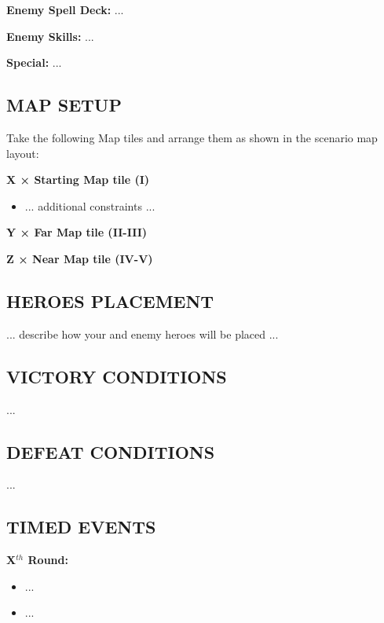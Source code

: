 \begin{multicols*}{2}
\textbf{Enemy Spell Deck:} ...

\textbf{Enemy Skills:} ...

\textbf{Special:} ...

\subsection*{\MakeUppercase{Map setup}}

Take the following Map tiles and arrange them as shown in the scenario map layout:

\textbf{X × Starting Map tile (I)}
\begin{itemize}
    \item ... additional constraints ...
\end{itemize}

\textbf{Y × Far Map tile (II-III)}

\textbf{Z × Near Map tile (IV-V)}

\subsection*{\MakeUppercase{Heroes placement}}

... describe how your and enemy heroes will be placed ...

\subsection*{\MakeUppercase{Victory Conditions}}
...

\subsection*{\MakeUppercase{Defeat Conditions}}
...

\subsection*{\MakeUppercase{Timed Events}}

\textbf{X$^{th}$ Round:}
\begin{itemize}
  \item ...
  \item ...
\end{itemize}

%
%
%


\end{multicols*}
